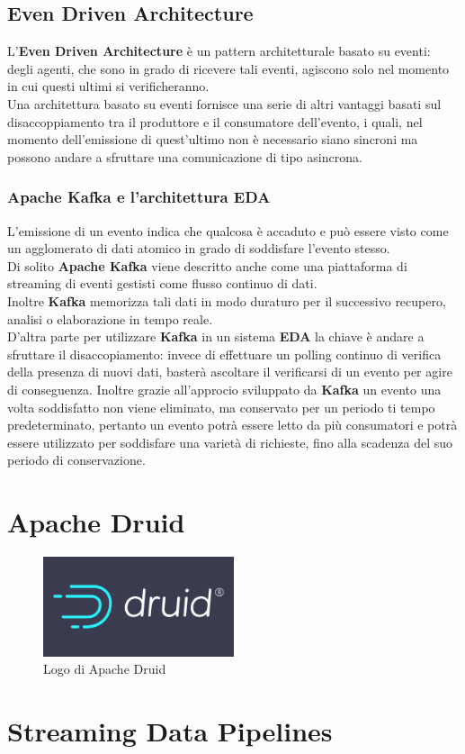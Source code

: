 \subsection{Even Driven Architecture}
L'\textbf{Even Driven Architecture} è un pattern architetturale basato su eventi: degli agenti, che sono in grado di ricevere tali eventi, agiscono solo nel momento in cui questi ultimi si verificheranno. 
\\Una architettura basato su eventi fornisce una serie di altri vantaggi basati sul disaccoppiamento tra il produttore e il consumatore dell'evento, i quali, nel momento dell'emissione di quest'ultimo non è necessario siano sincroni ma possono andare a sfruttare una comunicazione di tipo asincrona. 
\subsubsection{Apache Kafka e l'architettura EDA}
L'emissione di un evento indica che qualcosa è accaduto e può essere visto come un agglomerato di dati atomico in grado di soddisfare l'evento stesso. \\
Di solito \textbf{Apache Kafka} viene descritto anche come una piattaforma di \gls{streaming di eventi} gestisti come flusso continuo di dati. \\Inoltre \textbf{Kafka} memorizza tali dati in modo duraturo per il successivo recupero, analisi o elaborazione in tempo reale.
\\D'altra parte per utilizzare \textbf{Kafka} in un sistema \textbf{EDA} la chiave è andare a sfruttare il disaccopiamento: invece di effettuare un polling continuo di verifica della presenza di nuovi dati, basterà ascoltare il verificarsi di un evento per agire di conseguenza. Inoltre grazie all'approcio sviluppato da \textbf{Kafka} un evento una volta soddisfatto non viene eliminato, ma conservato per un periodo ti tempo predeterminato, pertanto un evento potrà essere letto da più consumatori e potrà essere utilizzato per soddisfare una varietà di richieste, fino alla scadenza del suo periodo di conservazione. \\
\pagebreak
\section{Apache Druid}
\begin{figure}[h]
    \centering
    \includegraphics[width=0.5\textwidth]{images/componenti/logo_druid.png}
    \caption{Logo di Apache Druid}
    \label{fig:logo_druid}
\end{figure}
\section{Streaming Data Pipelines}
\newpage
\pagestyle{empty}
\null %
\newpage
